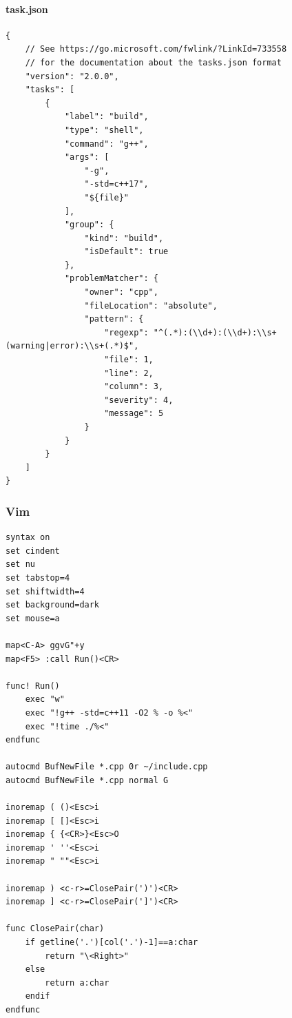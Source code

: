 \documentclass[twoside]{article}
\begin{document}
\paragraph{task.json}
\begin{lstlisting}
{
    // See https://go.microsoft.com/fwlink/?LinkId=733558
    // for the documentation about the tasks.json format
    "version": "2.0.0",
    "tasks": [
        {
            "label": "build",
            "type": "shell",
            "command": "g++",
            "args": [
                "-g",
                "-std=c++17",
                "${file}"
            ],
            "group": {
                "kind": "build",
                "isDefault": true
            },
            "problemMatcher": {
                "owner": "cpp",
                "fileLocation": "absolute",
                "pattern": {
                    "regexp": "^(.*):(\\d+):(\\d+):\\s+(warning|error):\\s+(.*)$",
                    "file": 1,
                    "line": 2,
                    "column": 3,
                    "severity": 4,
                    "message": 5
                }
            }
        }
    ]
}
\end{lstlisting}
\subsubsection{Vim}
\begin{lstlisting}
syntax on
set cindent
set nu
set tabstop=4
set shiftwidth=4
set background=dark
set mouse=a

map<C-A> ggvG"+y
map<F5> :call Run()<CR>

func! Run()
    exec "w"
    exec "!g++ -std=c++11 -O2 % -o %<"
    exec "!time ./%<"
endfunc

autocmd BufNewFile *.cpp 0r ~/include.cpp
autocmd BufNewFile *.cpp normal G

inoremap ( ()<Esc>i
inoremap [ []<Esc>i
inoremap { {<CR>}<Esc>O
inoremap ' ''<Esc>i
inoremap " ""<Esc>i

inoremap ) <c-r>=ClosePair(')')<CR>
inoremap ] <c-r>=ClosePair(']')<CR>

func ClosePair(char)
	if getline('.')[col('.')-1]==a:char
		return "\<Right>"
	else
		return a:char
	endif
endfunc
\end{lstlisting}
\end{document}
